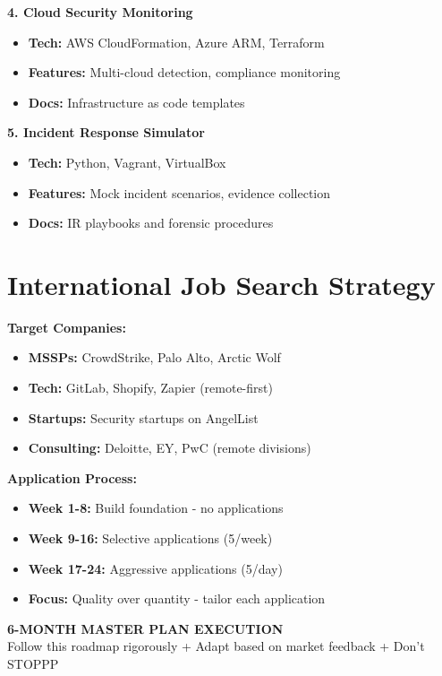 \documentclass[11pt,a4paper]{article}
\begin{document}
\textbf{4. Cloud Security Monitoring}
\begin{itemize}
    \item \textbf{Tech:} AWS CloudFormation, Azure ARM, Terraform
    \item \textbf{Features:} Multi-cloud detection, compliance monitoring
    \item \textbf{Docs:} Infrastructure as code templates
\end{itemize}

\textbf{5. Incident Response Simulator}
\begin{itemize}
    \item \textbf{Tech:} Python, Vagrant, VirtualBox
    \item \textbf{Features:} Mock incident scenarios, evidence collection
    \item \textbf{Docs:} IR playbooks and forensic procedures
\end{itemize}

\section*{International Job Search Strategy}

\textbf{\color{cyberblue} Target Companies:}
\begin{itemize}
    \item \textbf{MSSPs:} CrowdStrike, Palo Alto, Arctic Wolf
    \item \textbf{Tech:} GitLab, Shopify, Zapier (remote-first)
    \item \textbf{Startups:} Security startups on AngelList
    \item \textbf{Consulting:} Deloitte, EY, PwC (remote divisions)
\end{itemize}

\textbf{\color{cybergreen} Application Process:}
\begin{itemize}
    \item \textbf{Week 1-8:} Build foundation - no applications
    \item \textbf{Week 9-16:} Selective applications (5/week)
    \item \textbf{Week 17-24:} Aggressive applications (5/day)
    \item \textbf{Focus:} Quality over quantity - tailor each application
\end{itemize}


\begin{center}
    \vspace{0.5cm}
    \textcolor{cyberblue}{\Large \textbf{ 6-MONTH MASTER PLAN EXECUTION}} \\
    \textcolor{cybergreen}{\small Follow this roadmap rigorously + Adapt based on market feedback +  Don't STOPPP}
\end{center}
\end{document}
